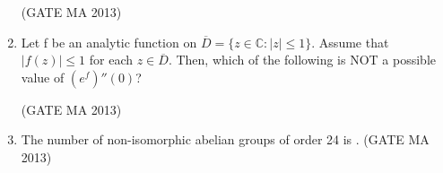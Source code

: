 \documentclass[journal,12pt,onecolumn]{IEEEtran}
\theoremstyle{remark}
\begin{document}
\begin{enumerate}
\begin{enumerate}
    \end{enumerate}
    \hfill (GATE MA 2013)
    \item Let f be an analytic function on $\overline{D} = \{z \in \mathbb{C} : |z| \le 1\}$. Assume that $|f(z)| \le 1$ for each $z \in \overline{D}$. Then, which of the following is NOT a possible value of $(e^f)''(0)$?
    \begin{enumerate}
    \end{enumerate}
    \hfill (GATE MA 2013)
    \item The number of non-isomorphic abelian groups of order 24 is \underline{\hspace{1cm}}.
    \hfill (GATE MA 2013)
\end{enumerate}
\end{document}
